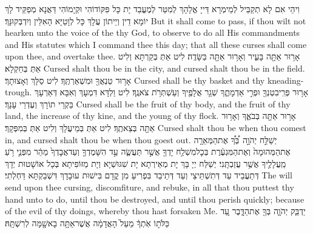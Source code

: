 {וִיהֵי אִם לָא תְקַבֵּיל לְמֵימְרָא דַּייָ אֱלָהָךְ לְמִטַּר לְמֶעֱבַד יָת כָּל פִּקּוֹדוֹהִי וּקְיָמוֹהִי דַּאֲנָא מְפַקֵּיד לָךְ יוֹמָא דֵין וְיֵיתוֹן עֲלָךְ כָּל לְוָטַיָּא הָאִלֵּין וְיִדְבְּקוּנָּךְ׃}
{But it shall come to pass, if thou wilt not hearken unto the voice of the \lord\space thy God, to observe to do all His commandments and His statutes which I command thee this day; that all these curses shall come upon thee, and overtake thee.}{}
{אָר֥וּר אַתָּ֖ה בָּעִ֑יר וְאָר֥וּר אַתָּ֖ה בַּשָּׂדֶֽה׃}
{לִיט אַתְּ בְּקַרְתָּא וְלִיט אַתְּ בְּחַקְלָא׃}
{Cursed shalt thou be in the city, and cursed shalt thou be in the field.}{}
{אָר֥וּר טַנְאֲךָ֖ וּמִשְׁאַרְתֶּֽךָ׃}
{לִיט סַלָּךְ וְאָצוּתָךְ׃}
{Cursed shall be thy basket and thy kneading-trough.}{}
{אָר֥וּר פְּרִֽי\maqqaf בִטְנְךָ֖ וּפְרִ֣י אַדְמָתֶ֑ךָ שְׁגַ֥ר אֲלָפֶ֖יךָ וְעַשְׁתְּרֹ֥ת צֹאנֶֽךָ׃}
{לִיט וַלְדָּא דִּמְעָךְ וְאִבָּא דְּאַרְעָךְ בַּקְרֵי תוֹרָךְ וְעֶדְרֵי עָנָךְ׃}
{Cursed shall be the fruit of thy body, and the fruit of thy land, the increase of thy kine, and the young of thy flock.}{}
{אָר֥וּר אַתָּ֖ה בְּבֹאֶ֑ךָ וְאָר֥וּר אַתָּ֖ה בְּצֵאתֶֽךָ׃}
{לִיט אַתְּ בְּמֵיעֲלָךְ וְלִיט אַתְּ בְּמִפְּקָךְ׃}
{Cursed shalt thou be when thou comest in, and cursed shalt thou be when thou goest out.}{}
{יְשַׁלַּ֣ח יְהֹוָ֣ה \pasek  בְּ֠ךָ֠ אֶת\maqqaf הַמְּאֵרָ֤ה אֶת\maqqaf הַמְּהוּמָה֙ וְאֶת\maqqaf הַמִּגְעֶ֔רֶת בְּכׇל\maqqaf מִשְׁלַ֥ח יָדְךָ֖ אֲשֶׁ֣ר תַּעֲשֶׂ֑ה עַ֣ד הִשָּׁמֶדְךָ֤ וְעַד\maqqaf אֲבׇדְךָ֙ מַהֵ֔ר מִפְּנֵ֛י רֹ֥עַ מַֽעֲלָלֶ֖יךָ אֲשֶׁ֥ר עֲזַבְתָּֽנִי׃}
{יְשַׁלַּח יְיָ בָּךְ יָת מְאֵירְתָא יָת שִׁגּוּשְׁיָא וְיָת מַזּוֹפִיתָא בְּכָל אוֹשָׁטוּת יְדָךְ דְּתַעֲבֵיד עַד דְּתִשְׁתֵּיצֵי וְעַד דְּתֵיבַד בִּפְרִיעַ מִן קֳדָם בִּישׁוּת עוּבָדָךְ דִּשְׁבַקְתָּא דַּחְלְתִי׃}
{The \lord\space will send upon thee cursing, discomfiture, and rebuke, in all that thou puttest thy hand unto to do, until thou be destroyed, and until thou perish quickly; because of the evil of thy doings, whereby thou hast forsaken Me.}{}
{יַדְבֵּ֧ק יְהֹוָ֛ה בְּךָ֖ אֶת\maqqaf הַדָּ֑בֶר עַ֚ד כַּלֹּת֣וֹ אֹֽתְךָ֔ מֵעַל֙ הָאֲדָמָ֔ה אֲשֶׁר\maqqaf אַתָּ֥ה בָא\maqqaf שָׁ֖מָּה לְרִשְׁתָּֽהּ׃}
